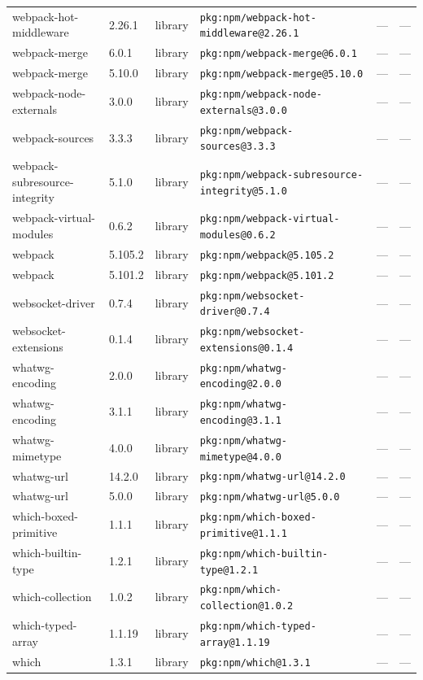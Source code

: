 \documentclass[11pt]{article}
\begin{document}
\begin{longtable}{|l|l|l|p{2.2cm}|l|p{4cm}|}
webpack-hot-middleware & 2.26.1 & library & \texttt{pkg:npm/webpack-hot-middleware@2.26.1} & — & — \\
webpack-merge & 6.0.1 & library & \texttt{pkg:npm/webpack-merge@6.0.1} & — & — \\
webpack-merge & 5.10.0 & library & \texttt{pkg:npm/webpack-merge@5.10.0} & — & — \\
webpack-node-externals & 3.0.0 & library & \texttt{pkg:npm/webpack-node-externals@3.0.0} & — & — \\
webpack-sources & 3.3.3 & library & \texttt{pkg:npm/webpack-sources@3.3.3} & — & — \\
webpack-subresource-integrity & 5.1.0 & library & \texttt{pkg:npm/webpack-subresource-integrity@5.1.0} & — & — \\
webpack-virtual-modules & 0.6.2 & library & \texttt{pkg:npm/webpack-virtual-modules@0.6.2} & — & — \\
webpack & 5.105.2 & library & \texttt{pkg:npm/webpack@5.105.2} & — & — \\
webpack & 5.101.2 & library & \texttt{pkg:npm/webpack@5.101.2} & — & — \\
websocket-driver & 0.7.4 & library & \texttt{pkg:npm/websocket-driver@0.7.4} & — & — \\
websocket-extensions & 0.1.4 & library & \texttt{pkg:npm/websocket-extensions@0.1.4} & — & — \\
whatwg-encoding & 2.0.0 & library & \texttt{pkg:npm/whatwg-encoding@2.0.0} & — & — \\
whatwg-encoding & 3.1.1 & library & \texttt{pkg:npm/whatwg-encoding@3.1.1} & — & — \\
whatwg-mimetype & 4.0.0 & library & \texttt{pkg:npm/whatwg-mimetype@4.0.0} & — & — \\
whatwg-url & 14.2.0 & library & \texttt{pkg:npm/whatwg-url@14.2.0} & — & — \\
whatwg-url & 5.0.0 & library & \texttt{pkg:npm/whatwg-url@5.0.0} & — & — \\
which-boxed-primitive & 1.1.1 & library & \texttt{pkg:npm/which-boxed-primitive@1.1.1} & — & — \\
which-builtin-type & 1.2.1 & library & \texttt{pkg:npm/which-builtin-type@1.2.1} & — & — \\
which-collection & 1.0.2 & library & \texttt{pkg:npm/which-collection@1.0.2} & — & — \\
which-typed-array & 1.1.19 & library & \texttt{pkg:npm/which-typed-array@1.1.19} & — & — \\
which & 1.3.1 & library & \texttt{pkg:npm/which@1.3.1} & — & — \\

\end{longtable}
\end{document}
